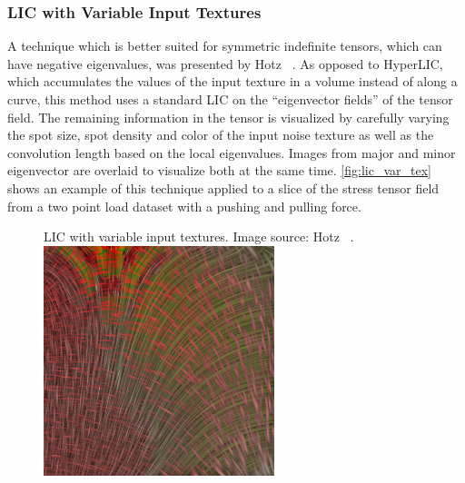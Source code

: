 \subsubsection{\ac{LIC} with Variable Input Textures} %
\label{ssub:lic_with_variable_input_textures}
%
A technique which is better suited for symmetric indefinite tensors, which can
have negative eigenvalues, was presented by Hotz \etal~\cite{Hotz2004}.
%
As opposed to HyperLIC, which accumulates the values of the input texture in a
volume instead of along a curve, this method uses a standard \ac{LIC} on the
``eigenvector fields'' of the tensor field.
%
The remaining information in the tensor is visualized by carefully varying the
spot size, spot density and color of the input noise texture as well as the
convolution length based on the local eigenvalues.
%
Images from major and minor eigenvector are overlaid to visualize both at the
same time.
%
\autoref{fig:lic_var_tex} shows an example of this technique applied to a slice
of the stress tensor field from a two point load dataset with a pushing and
pulling force.
%
\begin{figure}[t]
    \begin{captionbeside}{LIC with variable input textures. Image source: Hotz
    \etal~\cite{Hotz2004}.}
        \includegraphics[width=0.6\textwidth]{figures/tensor_lic_variable_texture.png}
    \end{captionbeside}
    \label{fig:lic_var_tex}
\end{figure}
%

